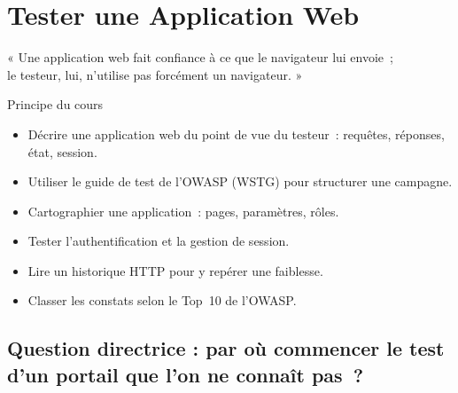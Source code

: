 
\chapter{Tester une Application Web}
\label{chap:web}

\epigraph{%
    « Une application web fait confiance à ce que le navigateur lui envoie~;\\
    le testeur, lui, n'utilise pas forcément un navigateur. »%
}{Principe du cours}


\begin{boxobjectifs}
\begin{itemize}
    \item Décrire une application web du point de vue du testeur~: requêtes,
          réponses, état, session.
    \item Utiliser le guide de test de l'OWASP (WSTG) pour structurer une
          campagne.
    \item Cartographier une application~: pages, paramètres, rôles.
    \item Tester l'authentification et la gestion de session.
    \item Lire un historique HTTP pour y repérer une faiblesse.
    \item Classer les constats selon le Top~10 de l'OWASP.
\end{itemize}
\end{boxobjectifs}

\bigskip

\section*{Question directrice : par où commencer le test d'un portail que l'on ne connaît pas~?}

